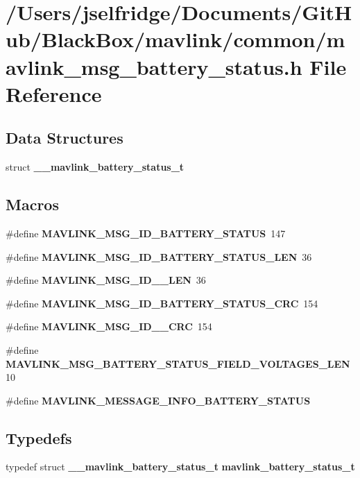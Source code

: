 \section{/\+Users/jselfridge/\+Documents/\+Git\+Hub/\+Black\+Box/mavlink/common/mavlink\+\_\+msg\+\_\+battery\+\_\+status.h File Reference}
\label{mavlink__msg__battery__status_8h}
\subsection*{Data Structures}
\begin{DoxyCompactItemize}
\item 
struct \textbf{ \+\_\+\+\_\+mavlink\+\_\+battery\+\_\+status\+\_\+t}
\end{DoxyCompactItemize}
\subsection*{Macros}
\begin{DoxyCompactItemize}
\item 
\#define \textbf{ M\+A\+V\+L\+I\+N\+K\+\_\+\+M\+S\+G\+\_\+\+I\+D\+\_\+\+B\+A\+T\+T\+E\+R\+Y\+\_\+\+S\+T\+A\+T\+US}~147
\item 
\#define \textbf{ M\+A\+V\+L\+I\+N\+K\+\_\+\+M\+S\+G\+\_\+\+I\+D\+\_\+\+B\+A\+T\+T\+E\+R\+Y\+\_\+\+S\+T\+A\+T\+U\+S\+\_\+\+L\+EN}~36
\item 
\#define \textbf{ M\+A\+V\+L\+I\+N\+K\+\_\+\+M\+S\+G\+\_\+\+I\+D\+\_\+\_\+\+L\+EN}~36
\item 
\#define \textbf{ M\+A\+V\+L\+I\+N\+K\+\_\+\+M\+S\+G\+\_\+\+I\+D\+\_\+\+B\+A\+T\+T\+E\+R\+Y\+\_\+\+S\+T\+A\+T\+U\+S\+\_\+\+C\+RC}~154
\item 
\#define \textbf{ M\+A\+V\+L\+I\+N\+K\+\_\+\+M\+S\+G\+\_\+\+I\+D\+\_\+\_\+\+C\+RC}~154
\item 
\#define \textbf{ M\+A\+V\+L\+I\+N\+K\+\_\+\+M\+S\+G\+\_\+\+B\+A\+T\+T\+E\+R\+Y\+\_\+\+S\+T\+A\+T\+U\+S\+\_\+\+F\+I\+E\+L\+D\+\_\+\+V\+O\+L\+T\+A\+G\+E\+S\+\_\+\+L\+EN}~10
\item 
\#define \textbf{ M\+A\+V\+L\+I\+N\+K\+\_\+\+M\+E\+S\+S\+A\+G\+E\+\_\+\+I\+N\+F\+O\+\_\+\+B\+A\+T\+T\+E\+R\+Y\+\_\+\+S\+T\+A\+T\+US}
\end{DoxyCompactItemize}
\subsection*{Typedefs}
\begin{DoxyCompactItemize}
\item 
typedef struct \textbf{ \+\_\+\+\_\+mavlink\+\_\+battery\+\_\+status\+\_\+t} \textbf{ mavlink\+\_\+battery\+\_\+status\+\_\+t}
\end{DoxyCompactItemize}


